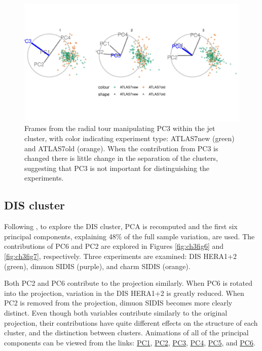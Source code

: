 \documentclass{template/monashthesis}
\begin{document}
\begin{figure}

{\centering \includegraphics[width=1\linewidth,]{./figures_from_script/ch3_fig5_jet_worse_pc3} 

}

\caption{Frames from the radial tour manipulating PC3 within the jet cluster, with color indicating experiment type: ATLAS7new (green) and ATLAS7old (orange).  When the contribution from PC3 is changed there is little change in the separation of the clusters, suggesting that PC3 is not important for distinguishing the experiments.}\label{fig:ch3fig5}
\end{figure}

\hypertarget{dis-cluster}{%
\subsection{DIS cluster}\label{dis-cluster}}

Following \textcite{cook_dynamical_2018}, to explore the DIS cluster, PCA is recomputed and the first six principal components, explaining 48\% of the full sample variation, are used. The contributions of PC6 and PC2 are explored in Figures \ref{fig:ch3fig6} and \ref{fig:ch3fig7}, respectively. Three experiments are examined: DIS HERA1+2 (green), dimuon SIDIS (purple), and charm SIDIS (orange).

Both PC2 and PC6 contribute to the projection similarly. When PC6 is rotated into the projection, variation in the DIS HERA1+2 is greatly reduced. When PC2 is removed from the projection, dimuon SIDIS becomes more clearly distinct. Even though both variables contribute similarly to the original projection, their contributions have quite different effects on the structure of each cluster, and the distinction between clusters. Animations of all of the principal components can be viewed from the links: \href{https://github.com/nspyrison/spinifex_paper/blob/master/paper/gifs/discluster_manualtour_pc1.gif}{PC1}, \href{https://github.com/nspyrison/spinifex_paper/blob/master/paper/gifs/discluster_manualtour_pc2.gif}{PC2}, \href{https://github.com/nspyrison/spinifex_paper/blob/master/paper/gifs/discluster_manualtour_pc3.gif}{PC3}, \href{https://github.com/nspyrison/spinifex_paper/blob/master/paper/gifs/discluster_manualtour_pc4.gif}{PC4}, \href{https://github.com/nspyrison/spinifex_paper/blob/master/paper/gifs/discluster_manualtour_pc5.gif}{PC5}, and \href{https://github.com/nspyrison/spinifex_paper/blob/master/paper/gifs/discluster_manualtour_pc6.gif}{PC6}.
\end{document}

